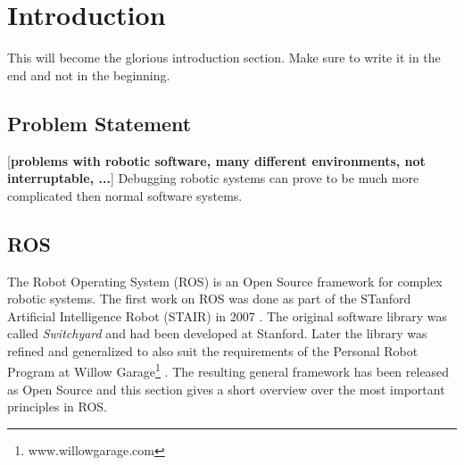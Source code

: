 \chapter{Introduction}

This will become the glorious introduction section. Make sure to write it in
the end and not in the beginning.

\section{Problem Statement}
\label{problem_statement}
[\textbf{problems with robotic software, many different environments, not interruptable, ...}]
Debugging robotic systems can prove to be much more complicated then normal software systems. 

\section{ROS}
The Robot Operating System (ROS) is an Open Source framework for complex robotic systems. The first work on ROS was done as part of the STanford Artificial Intelligence Robot (STAIR) in 2007 \cite{Quigley2007}. The original software library was called \emph{Switchyard} and had been developed at Stanford. Later the library was refined and generalized to also suit the requirements of the Personal Robot Program at Willow Garage\footnote{www.willowgarage.com} \cite{Quigley2009}. The resulting general framework has been released as Open Source \cite{Quigley2009} and this section gives a short overview over the most important principles in ROS.

